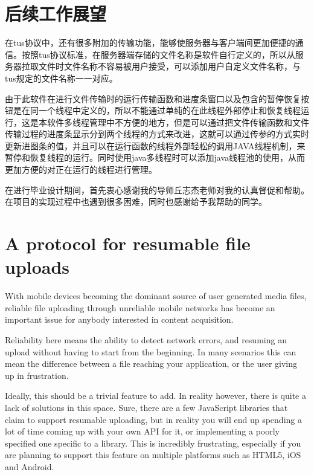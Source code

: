 \documentclass[bachelor]{thesis-uestc}
\begin{document}
\section{后续工作展望}
在tus协议中，还有很多附加的传输功能，能够使服务器与客户端间更加便捷的通信。按照tus协议标准，在服务器端存储的文件名称是软件自行定义的，所以从服务器拉取文件时文件名称不容易被用户接受，可以添加用户自定义文件名称，与tus规定的文件名称一一对应。
\par 由于此软件在进行文件传输时的运行传输函数和进度条窗口以及包含的暂停恢复按钮是在同一个线程中定义的，所以不能通过单纯的在此线程外部停止和恢复线程运行，这是本软件多线程管理中不方便的地方，但是可以通过把文件传输函数和文件传输过程的进度条显示分到两个线程的方式来改进，这就可以通过传参的方式实时更新进图条的值，并且可以在运行函数的线程外部轻松的调用JAVA线程机制，来暂停和恢复线程的运行。同时使用java多线程时可以添加java线程池的使用，从而更加方便的对正在运行的线程进行管理。

\thesisacknowledgement
在进行毕业设计期间，首先衷心感谢我的导师丘志杰老师对我的认真督促和帮助。在项目的实现过程中也遇到很多困难，同时也感谢给予我帮助的同学。



%
% 
%
% 
% 
%




\thesistranslationoriginal
\section{A protocol for resumable file uploads}
With mobile devices becoming the dominant source of user generated media files, reliable file uploading through unreliable mobile networks has become an important issue for anybody interested in content acquisition.

Reliability here means the ability to detect network errors, and resuming an upload without having to start from the beginning. In many scenarios this can mean the difference between a file reaching your application, or the user giving up in frustration.

Ideally, this should be a trivial feature to add. In reality however, there is quite a lack of solutions in this space. Sure, there are a few JavaScript libraries that claim to support resumable uploading, but in reality you will end up spending a lot of time coming up with your own API for it, or implementing a poorly specified one specific to a library. This is incredibly frustrating, especially if you are planning to support this feature on multiple platforms such as HTML5, iOS and Android.
\end{document}
